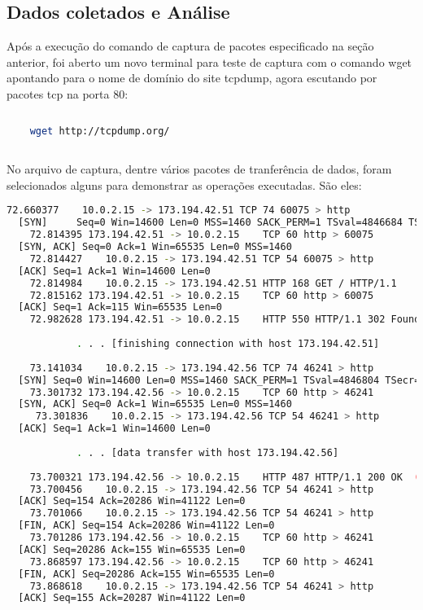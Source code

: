 \documentclass[a4paper]{report} %
\begin{document}
\subsection{Dados coletados e Análise}
\label{sub_http_dados}

	Após a execução do comando de captura de pacotes especificado na seção anterior, foi aberto um novo terminal para teste de captura com o comando wget apontando para o nome de domínio do site tcpdump, agora escutando por pacotes tcp na porta 80:

\begin{lstlisting}[language=bash]
	
	wget http://tcpdump.org/ 
	
\end{lstlisting}

	No arquivo de captura, dentre vários pacotes de tranferência de dados, foram selecionados alguns para demonstrar as operações executadas. São eles:
	
\begin{lstlisting}[language=bash]
	72.660377    10.0.2.15 -> 173.194.42.51 TCP 74 60075 > http 
  [SYN] 	Seq=0 Win=14600 Len=0 MSS=1460 SACK_PERM=1 TSval=4846684 TSecr=0 WS=64
	72.814395 173.194.42.51 -> 10.0.2.15    TCP 60 http > 60075 
  [SYN, ACK] Seq=0 Ack=1 Win=65535 Len=0 MSS=1460
	72.814427    10.0.2.15 -> 173.194.42.51 TCP 54 60075 > http 
  [ACK] Seq=1 Ack=1 Win=14600 Len=0
	72.814984    10.0.2.15 -> 173.194.42.51 HTTP 168 GET / HTTP/1.1 
	72.815162 173.194.42.51 -> 10.0.2.15    TCP 60 http > 60075 
  [ACK] Seq=1 Ack=115 Win=65535 Len=0
	72.982628 173.194.42.51 -> 10.0.2.15    HTTP 550 HTTP/1.1 302 Found  (text/html)
	
     		. . . [finishing connection with host 173.194.42.51]
	
	73.141034    10.0.2.15 -> 173.194.42.56 TCP 74 46241 > http 
  [SYN] Seq=0 Win=14600 Len=0 MSS=1460 SACK_PERM=1 TSval=4846804 TSecr=0 WS=64
	73.301732 173.194.42.56 -> 10.0.2.15    TCP 60 http > 46241 
  [SYN, ACK] Seq=0 Ack=1 Win=65535 Len=0 MSS=1460
     73.301836    10.0.2.15 -> 173.194.42.56 TCP 54 46241 > http 
  [ACK] Seq=1 Ack=1 Win=14600 Len=0
     
     		. . . [data transfer with host 173.194.42.56]
     					 					
	73.700321 173.194.42.56 -> 10.0.2.15    HTTP 487 HTTP/1.1 200 OK  (text/html)
	73.700456    10.0.2.15 -> 173.194.42.56 TCP 54 46241 > http 
  [ACK] Seq=154 Ack=20286 Win=41122 Len=0     					
	73.701066    10.0.2.15 -> 173.194.42.56 TCP 54 46241 > http 
  [FIN, ACK] Seq=154 Ack=20286 Win=41122 Len=0
	73.701286 173.194.42.56 -> 10.0.2.15    TCP 60 http > 46241
  [ACK] Seq=20286 Ack=155 Win=65535 Len=0
	73.868597 173.194.42.56 -> 10.0.2.15    TCP 60 http > 46241 
  [FIN, ACK] Seq=20286 Ack=155 Win=65535 Len=0
	73.868618    10.0.2.15 -> 173.194.42.56 TCP 54 46241 > http 
  [ACK] Seq=155 Ack=20287 Win=41122 Len=0  					
  
     
\end{lstlisting}
	
\end{document}
